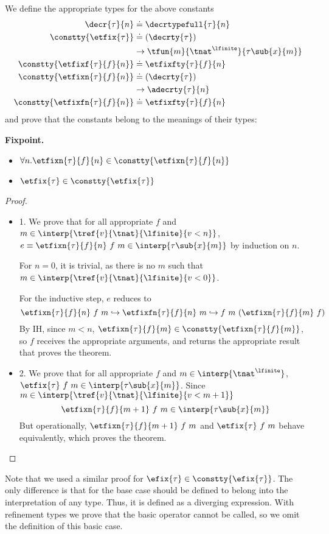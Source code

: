 %
We define the appropriate types for the above constants
%
\begin{align*}
\decr{\tau}{n} & \doteq \decrtypefull{\tau}{n}\\
\constty{\etfix{\tau}} &\doteq (\decrty{\tau})\\
	& \rightarrow
	\tfun{m}{\tnat^\lfinite}{\tau\sub{x}{m}}\\ 
\constty{\etfixf{\tau}{f}{n}} &\doteq 
	 \etfixfty{\tau}{f}{n}\\ 
\constty{\etfixn{\tau}{f}{n}} &\doteq  
	(\decrty{\tau})\\&
	\rightarrow\adecrty{\tau}{n}\\ 
\constty{\etfixfn{\tau}{f}{n}} &\doteq 
	 \etfixfty{\tau}{f}{n}\\ 
\end{align*}
and prove that the constants belong to the 
meanings of their types:
%
\begin{theorem}\textbf{Fixpoint.}\label{thm:fixpoint}
\begin{itemize}
\item$\forall n. \etfixn{\tau}{f}{n} \in \constty{\etfixn{\tau}{f}{n}}$
\item$\etfix{\tau} \in \constty{\etfix{\tau}}$
\end{itemize}
\end{theorem}
\begin{proof}
\begin{itemize}
\item 1.
We prove that for all
appropriate $f$
and $ m \in \interp{\tref{v}{\tnat}{\lfinite}{v < n}}$,
$e \equiv \etfixn{\tau}{f}{n}\ f \ m \in \interp{\tau\sub{x}{m}}$
% 
by induction on $n$.

For $n=0$, 
it is trivial, as 
there is no $m$ such that
$m \in \interp{\tref{v}{\tnat}{\lfinite}{v < 0}}$.

For the inductive step, $e$ reduces to 
$$
\etfixn{\tau}{f}{n}\ f\ m 
\hookrightarrow
\etfixfn{\tau}{f}{n}\ m 
\hookrightarrow
f\ m\ (\etfixn{\tau}{f}{m}\ f)\\
$$
By IH, since $m < n$,
$\etfixn{\tau}{f}{m} \in \constty{\etfixn{\tau}{f}{m}}$, 
so $f$ receives the appropriate arguments, 
and returns the appropriate result that proves the theorem.
%
\item 2.
We prove that 
for all appropriate $f$
and     $ m \in \interp{\tnat^\lfinite}$,
$\etfix{\tau}\ f \ m \in \interp{\tau\sub{x}{m}}$.
%
Since $m \in \interp{\tref{v}{\tnat}{\lfinite}{v < m+1}}$
$$\etfixn{\tau}{f}{m+1}\ f \ m \in \interp{\tau\sub{x}{m}}$$
%
But operationally, 
$\etfixn{\tau}{f}{m+1}\ f \ m$
and
$\etfix{\tau}\ f \ m$
behave equivalently, which proves the theorem.
\end{itemize}
\end{proof}
%
Note that we used a similar proof for
$\efix{\tau} \in \constty{\efix{\tau}}$.
%
The only difference is that for the base case
 should be defined to belong 
into the interpretation of any type.
%
Thus, it is defined as a diverging expression.
%
With refinement types we prove that the basic
 operator
cannot be called, so we omit 
the definition of this basic case.

